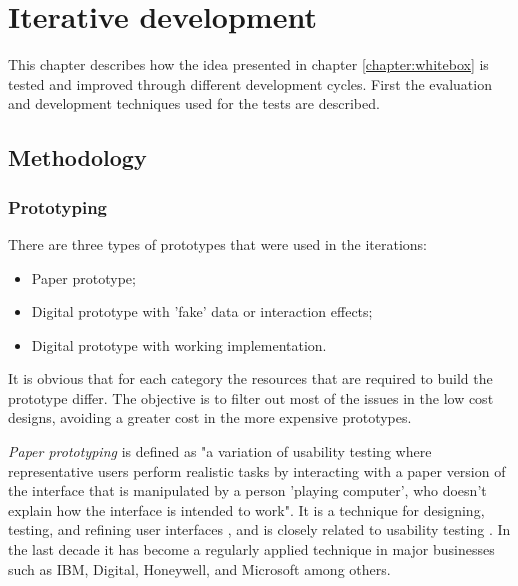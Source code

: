\chapter{Iterative development}\label{chapter:prototype}


This chapter describes how the idea presented in chapter \ref{chapter:whitebox} is tested and improved through different development cycles. First the evaluation and development techniques used for the tests are described.


\section{Methodology}\label{chapter:prototype:section:methodology}

\subsection{Prototyping}\label{chapter:prototype:section:methodology:subsection:development}


There are three types of prototypes that were used in the iterations:

\begin{itemize}
	\item Paper prototype;
	\item Digital prototype with 'fake' data or interaction effects;
	\item Digital prototype with working implementation.
\end{itemize}

It is obvious that for each category the resources that are required to build the prototype differ. The objective is to filter out most of the issues in the low cost designs, avoiding a greater cost in the more expensive prototypes.


\emph{Paper prototyping} is defined as "a variation of usability testing where representative users perform realistic tasks by interacting with a paper version of the interface that is manipulated by a person 'playing computer', who doesn’t explain how the interface is intended to work"\cite{snyder:2003:web}. It is a technique for designing, testing, and refining user interfaces \cite{snyder:2003}, and is closely related to usability testing \cite{snyder:2003:web}. In the last decade it has become a regularly applied technique in major businesses such as IBM, Digital, Honeywell, and Microsoft among others\cite{snyder:2003}.

